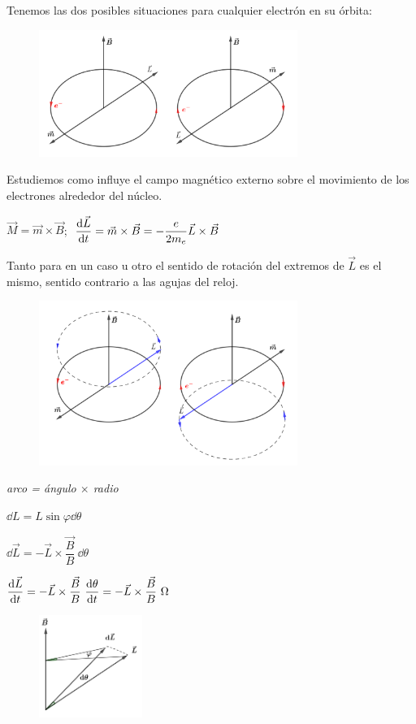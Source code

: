 Tenemos las dos posibles situaciones para cualquier electrón en su órbita:

\begin{figure}[H]
	\centering
	\includegraphics[width=0.75\textwidth]{imagenes/imagenes28/T28IM04.png}
\end{figure}

Estudiemos como influye el campo magnético externo sobre el movimiento de los electrones alrededor del núcleo.

$\vec M=\vec m \times \vec B$; $\ \displaystyle \dv{\vec L}{t}= \vec m\times \vec B=-\dfrac{e}{2m_e}\vec L \times \vec B$

Tanto para en un caso u otro el sentido de rotación del extremos de $\vec L$ es el mismo, sentido contrario a las agujas del reloj.

\begin{figure}[H]
	\centering
	\includegraphics[width=0.75\textwidth]{imagenes/imagenes28/T28IM05.png}
\end{figure}

\begin{multicols}{2}
\emph{arco = ángulo $\times$ radio}

$\dd L= L \sin \varphi \dd \theta$

$\dd \vec L = - \vec L \times \dfrac{\vec B}{B} \ \dd \theta$

$\displaystyle \dv{\vec L}{t}=-\vec L \times  \dfrac{\vec B}{B} \ \dv{\theta}{t}= - \vec L \times  \dfrac{\vec B}{B} \ \Omega$
\begin{figure}[H]
	\centering
	\includegraphics[width=0.3\textwidth]{imagenes/imagenes28/T28IM06.png}
\end{figure}	
\end{multicols}

